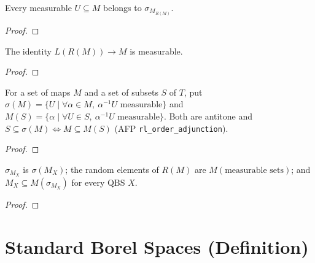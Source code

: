 \begin{lemma}\label{lem:sigma_Mx_R_qbs}
  \rocqok
  Every measurable $U \subseteq M$ belongs to $\sigma_{M_{R(M)}}$.
\end{lemma}
\begin{proof}\rocqok\end{proof}

\begin{lemma}\label{lem:adjunction_counit}
  \rocqok
  The identity $L(R(M)) \to M$ is measurable.
\end{lemma}
\begin{proof}\rocqok\end{proof}

\begin{theorem}\label{thm:sigma_of_Mx_of}
  \rocqok
  For a set of maps $M$ and a set of subsets $S$ of $T$, put $\sigma(M) = \{U \mid \forall \alpha \in M,\ \alpha^{-1}U \text{ measurable}\}$ and $M(S) = \{\alpha \mid \forall U \in S,\ \alpha^{-1}U \text{ measurable}\}$. Both are antitone and $S \subseteq \sigma(M) \iff M \subseteq M(S)$ (AFP \texttt{rl\_order\_adjunction}).
\end{theorem}
\begin{proof}\rocqok\end{proof}

\begin{lemma}\label{lem:sigma_MxE}
  \rocqok
  $\sigma_{M_X}$ is $\sigma(M_X)$; the random elements of $R(M)$ are $M(\text{measurable sets})$; and $M_X \subseteq M(\sigma_{M_X})$ for every QBS $X$.
\end{lemma}
\begin{proof}\rocqok\end{proof}


\section{Standard Borel Spaces (Definition)}\label{sec:standard_borel_def}

